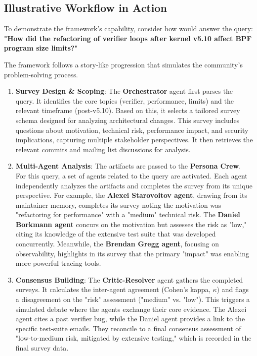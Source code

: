 \subsection{Illustrative Workflow in Action}

To demonstrate the framework's capability, consider how \sys would answer the query: \textbf{"How did the refactoring of verifier loops after kernel v5.10 affect BPF program size limits?"}

The framework follows a story-like progression that simulates the community's problem-solving process.

\begin{enumerate}
\item \textbf{Survey Design \& Scoping}: The \textbf{Orchestrator} agent first parses the query. It identifies the core topics (verifier, performance, limits) and the relevant timeframe (post-v5.10). Based on this, it selects a tailored survey schema designed for analyzing architectural changes. This survey includes questions about motivation, technical risk, performance impact, and security implications, capturing multiple stakeholder perspectives. It then retrieves the relevant commits and mailing list discussions for analysis.

\item \textbf{Multi-Agent Analysis}: The artifacts are passed to the \textbf{Persona Crew}. For this query, a set of agents related to the query are activated. Each agent independently analyzes the artifacts and completes the survey from its unique perspective. For example, the \textbf{Alexei Starovoitov agent}, drawing from its maintainer memory, completes its survey noting the motivation was "refactoring for performance" with a "medium" technical risk. The \textbf{Daniel Borkmann agent} concurs on the motivation but assesses the risk as "low," citing its knowledge of the extensive test suite that was developed concurrently. Meanwhile, the \textbf{Brendan Gregg agent}, focusing on observability, highlights in its survey that the primary "impact" was enabling more powerful tracing tools.

\item \textbf{Consensus Building}: The \textbf{Critic-Resolver} agent gathers the completed surveys. It calculates the inter-agent agreement (Cohen's kappa, $\kappa$) and flags a disagreement on the "risk" assessment ("medium" vs. "low"). This triggers a simulated debate where the agents exchange their core evidence. The Alexei agent cites a past verifier bug, while the Daniel agent provides a link to the specific test-suite emails. They reconcile to a final consensus assessment of "low-to-medium risk, mitigated by extensive testing," which is recorded in the final survey data.


\end{enumerate}
